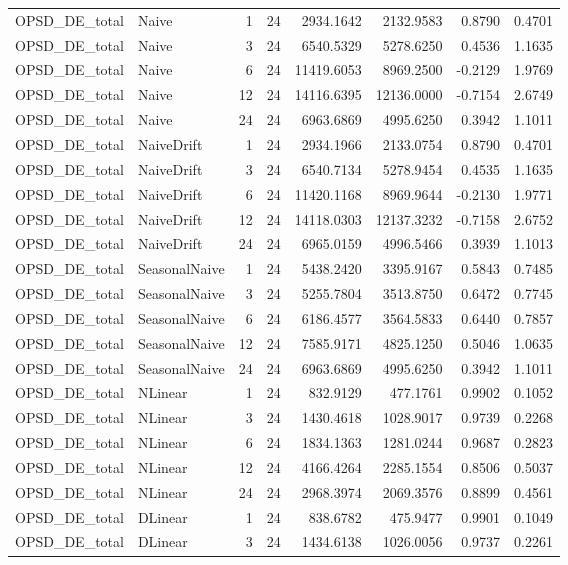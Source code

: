 \begin{tabular}{llrrrrrr}
OPSD_DE_total & Naive & 1 & 24 & 2934.1642 & 2132.9583 & 0.8790 & 0.4701 \\
OPSD_DE_total & Naive & 3 & 24 & 6540.5329 & 5278.6250 & 0.4536 & 1.1635 \\
OPSD_DE_total & Naive & 6 & 24 & 11419.6053 & 8969.2500 & -0.2129 & 1.9769 \\
OPSD_DE_total & Naive & 12 & 24 & 14116.6395 & 12136.0000 & -0.7154 & 2.6749 \\
OPSD_DE_total & Naive & 24 & 24 & 6963.6869 & 4995.6250 & 0.3942 & 1.1011 \\
OPSD_DE_total & NaiveDrift & 1 & 24 & 2934.1966 & 2133.0754 & 0.8790 & 0.4701 \\
OPSD_DE_total & NaiveDrift & 3 & 24 & 6540.7134 & 5278.9454 & 0.4535 & 1.1635 \\
OPSD_DE_total & NaiveDrift & 6 & 24 & 11420.1168 & 8969.9644 & -0.2130 & 1.9771 \\
OPSD_DE_total & NaiveDrift & 12 & 24 & 14118.0303 & 12137.3232 & -0.7158 & 2.6752 \\
OPSD_DE_total & NaiveDrift & 24 & 24 & 6965.0159 & 4996.5466 & 0.3939 & 1.1013 \\
OPSD_DE_total & SeasonalNaive & 1 & 24 & 5438.2420 & 3395.9167 & 0.5843 & 0.7485 \\
OPSD_DE_total & SeasonalNaive & 3 & 24 & 5255.7804 & 3513.8750 & 0.6472 & 0.7745 \\
OPSD_DE_total & SeasonalNaive & 6 & 24 & 6186.4577 & 3564.5833 & 0.6440 & 0.7857 \\
OPSD_DE_total & SeasonalNaive & 12 & 24 & 7585.9171 & 4825.1250 & 0.5046 & 1.0635 \\
OPSD_DE_total & SeasonalNaive & 24 & 24 & 6963.6869 & 4995.6250 & 0.3942 & 1.1011 \\
OPSD_DE_total & NLinear & 1 & 24 & 832.9129 & 477.1761 & 0.9902 & 0.1052 \\
OPSD_DE_total & NLinear & 3 & 24 & 1430.4618 & 1028.9017 & 0.9739 & 0.2268 \\
OPSD_DE_total & NLinear & 6 & 24 & 1834.1363 & 1281.0244 & 0.9687 & 0.2823 \\
OPSD_DE_total & NLinear & 12 & 24 & 4166.4264 & 2285.1554 & 0.8506 & 0.5037 \\
OPSD_DE_total & NLinear & 24 & 24 & 2968.3974 & 2069.3576 & 0.8899 & 0.4561 \\
OPSD_DE_total & DLinear & 1 & 24 & 838.6782 & 475.9477 & 0.9901 & 0.1049 \\
OPSD_DE_total & DLinear & 3 & 24 & 1434.6138 & 1026.0056 & 0.9737 & 0.2261 \\

\end{tabular}
